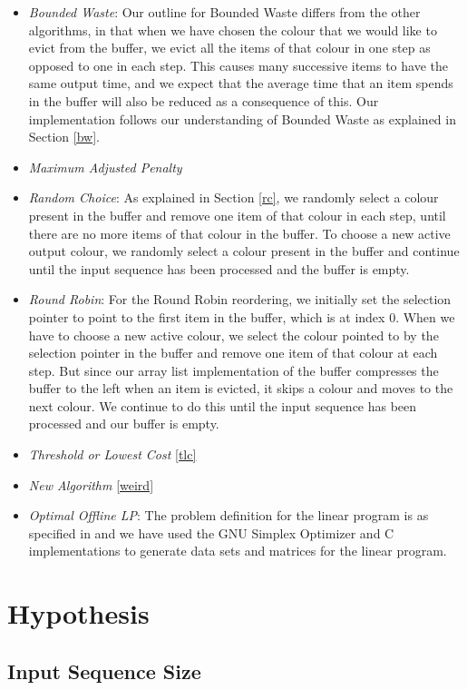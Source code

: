 \begin{itemize}
\item \textit{Bounded Waste}: Our outline for Bounded Waste differs from the other algorithms, in that when we have chosen the colour that we would like to evict from the buffer, we evict all the items of that colour in one step as opposed to one in each step. This causes many successive items to have the same output time, and we expect that the average time that an item spends in the buffer will also be reduced as a consequence of this. Our implementation follows our understanding of Bounded Waste as explained in Section \ref{bw}. 
\item \textit{Maximum Adjusted Penalty}
\item \textit{Random Choice}: As explained in Section \ref{rc}, we randomly select a colour present in the buffer and remove one item of that colour in each step, until there are no more items of that colour in the buffer. To choose a new active output colour, we randomly select a colour present in the buffer and continue until the input sequence has been processed and the buffer is empty. 
\item \textit{Round Robin}: For the Round Robin reordering, we initially set the selection pointer to point to the first item in the buffer, which is at index 0. When we have to choose a new active colour, we select the colour pointed to by the selection pointer in the buffer and remove one item of that colour at each step. But since our array list implementation of the buffer compresses the buffer to the left when an item is evicted, it skips a colour and moves to the next colour. We continue to do this until the input sequence has been processed and our buffer is empty.
\item \textit{Threshold or Lowest Cost} \ref{tlc}
\item \textit{New Algorithm} \ref{weird}
\item \textit{Optimal Offline LP}: The problem definition for the linear program is as specified in \cite{adamaszek2012optimal} and we have used the GNU Simplex Optimizer and C implementations to generate data sets and matrices for the linear program. 
\end{itemize}

\section{Hypothesis} \label{hypothesis}

\subsection{Input Sequence Size}

